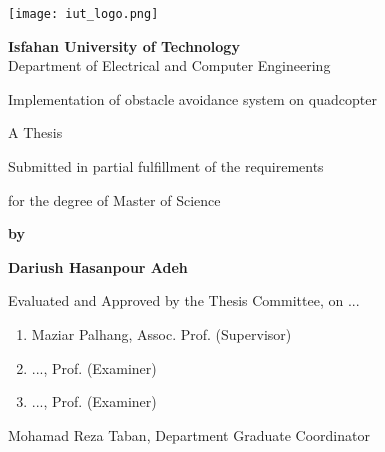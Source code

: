 \thispagestyle{empty}
\begin{latin}
\begin{center}
\texttt{[image: iut\_logo.png]}
\vspace{0.4cm}

{\large\textbf{Isfahan University of Technology}}\\

\vspace{0.4cm}
Department of Electrical and Computer Engineering

\vspace{2.5cm}

{\Huge Implementation of obstacle avoidance system on quadcopter}

\vspace{1.5cm}

{\large
	A Thesis
	
	\vspace{.3cm}
	
	Submitted in partial fulfillment of the requirements
	
	\vspace{.3cm}
	
	for the degree of Master of Science
}

	\vspace{1.5cm}

{\Large
	\textbf{by}
	
	\vspace{.3cm}
	
	\textbf{Dariush Hasanpour Adeh}
}
\end{center}

\vfill

Evaluated and Approved by the Thesis Committee, on ...
\vspace{0.5cm}

\begin{enumerate}
\item Maziar Palhang, Assoc. Prof. (Supervisor)
\vspace{0.5cm}

\item ..., Prof. (Examiner)
\vspace{0.5cm}

\item ..., Prof. (Examiner)
\vspace{0.5cm}

\end{enumerate}

Mohamad Reza Taban, Department Graduate Coordinator

\pagebreak
\end{latin}

\thispagestyle{empty}
\mbox{}

